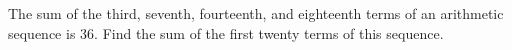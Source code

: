The sum of the third, seventh, fourteenth, and eighteenth terms of an arithmetic sequence is $36$. Find the sum of the first twenty terms of this sequence.
